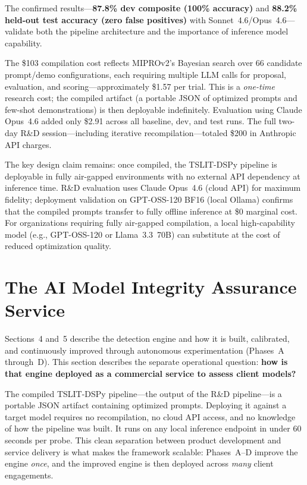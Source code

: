 \documentclass[11pt]{article}
\begin{document}
The confirmed results---\textbf{87.8\% dev composite (100\% accuracy)} and
\textbf{88.2\% held-out test accuracy (zero false positives)} with
Sonnet~4.6/Opus~4.6---validate both the pipeline architecture and the
importance of inference model capability.

The \$103 compilation cost reflects MIPROv2's Bayesian search over 66
candidate prompt/demo configurations, each requiring multiple LLM calls
for proposal, evaluation, and scoring---approximately \$1.57 per trial.
This is a \emph{one-time} research cost; the compiled artifact (a portable
JSON of optimized prompts and few-shot demonstrations) is then deployable
indefinitely. Evaluation using Claude Opus~4.6 added only \$2.91 across
all baseline, dev, and test runs. The full two-day R\&D session---including
iterative recompilation---totaled \$200 in Anthropic API charges.

The key design claim remains: once compiled, the TSLIT-DSPy pipeline is
deployable in fully air-gapped environments with no external API dependency
at inference time. R\&D evaluation uses Claude Opus~4.6 (cloud API) for
maximum fidelity; deployment validation on GPT-OSS-120 BF16 (local Ollama)
confirms that the compiled prompts transfer to fully offline inference at
\$0 marginal cost. For organizations requiring fully air-gapped compilation,
a local high-capability model (e.g., GPT-OSS-120 or Llama~3.3~70B) can
substitute at the cost of reduced optimization quality.

\section{The AI Model Integrity Assurance Service}
\label{sec:assurance}

Sections~4 and~5 describe the detection engine and how it is built,
calibrated, and continuously improved through autonomous experimentation
(Phases~A through~D). This section describes the separate operational
question: \textbf{how is that engine deployed as a commercial service
to assess client models?}

The compiled TSLIT-DSPy pipeline---the output of the R\&D
pipeline---is a portable JSON artifact containing optimized prompts.
Deploying it against a target model requires no recompilation, no cloud
API access, and no knowledge of how the pipeline was built. It runs
on any local inference endpoint in under 60 seconds per probe. This
clean separation between product development and service delivery is
what makes the framework scalable: Phases~A--D improve the engine
\emph{once}, and the improved engine is then deployed across
\emph{many} client engagements.
\end{document}
